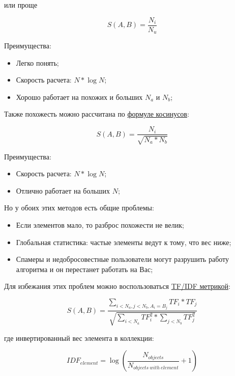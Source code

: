 или проще

\begin{equation}
 \label{eq:smlar2}
 S(A,B) = \frac{N_{i}}{N_{u}}
\end{equation}

Преимущества:

\begin{itemize}
  \item Легко понять;
  \item Скорость расчета: $N * \log{N}$;
  \item Хорошо работает на похожих и больших $N_a$ и $N_b$;
\end{itemize}

Также похожесть можно рассчитана по \href{http://en.wikipedia.org/wiki/Law\_of\_cosines}{формуле косинусов}:

\begin{equation}
 \label{eq:smlar3}
 S(A,B) = \frac{N_{i}}{\sqrt{N_{a}*N_{b}}}
\end{equation}

Преимущества:

\begin{itemize}
  \item Скорость расчета: $N * \log{N}$;
  \item Отлично работает на больших $N$;
\end{itemize}

Но у обоих этих методов есть общие проблемы:

\begin{itemize}
  \item Если элементов мало, то разброс похожести не велик;
  \item Глобальная статистика: частые элементы ведут к тому, что вес ниже;
  \item Спамеры и недобросовестные пользователи могут разрушить работу алгоритма и он перестанет работать на Вас;
\end{itemize}

Для избежания этих проблем можно воспользоваться \href{http://en.wikipedia.org/wiki/Tf*idf}{TF/IDF метрикой}:

\begin{equation}
 \label{eq:smlar4}
 S(A,B) = \frac{\sum_{i < N_{a}, j < N_{b}, A_{i} = B_{j}}TF_{i} * TF_{j}}{\sqrt{\sum_{i < N_{a}}TF_{i}^{2} * \sum_{j < N_{b}}TF_{j}^{2}}}
\end{equation}

где инвертированный вес элемента в коллекции:

\begin{equation}
 \label{eq:smlar5}
 IDF_{element} = \log{(\frac{N_{objects}}{N_{objects\ with\ element}} + 1)}
\end{equation}

